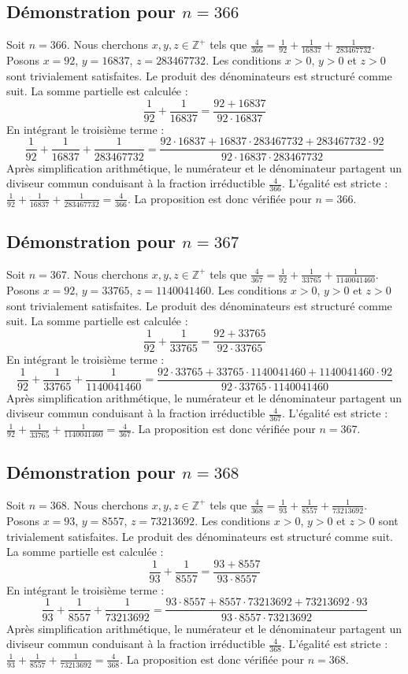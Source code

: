 \documentclass[11pt,a4paper]{article}
\begin{document}
\subsection{Démonstration pour $n = 366$}
Soit $n = 366$. Nous cherchons $x, y, z \in \mathbb{Z}^{+}$ tels que $\frac{4}{366} = \frac{1}{92} + \frac{1}{16837} + \frac{1}{283467732}$.
Posons $x = 92$, $y = 16837$, $z = 283467732$.
Les conditions $x > 0$, $y > 0$ et $z > 0$ sont trivialement satisfaites.
Le produit des dénominateurs est structuré comme suit. La somme partielle est calculée :
$$ \frac{1}{92} + \frac{1}{16837} = \frac{92+16837}{92 \cdot 16837} $$
En intégrant le troisième terme :
$$ \frac{1}{92} + \frac{1}{16837} + \frac{1}{283467732} = \frac{92 \cdot 16837 + 16837 \cdot 283467732 + 283467732 \cdot 92}{92 \cdot 16837 \cdot 283467732} $$
Après simplification arithmétique, le numérateur et le dénominateur partagent un diviseur commun conduisant à la fraction irréductible $\frac{4}{366}$.
L'égalité est stricte : $\frac{1}{92} + \frac{1}{16837} + \frac{1}{283467732} = \frac{4}{366}$.
La proposition est donc vérifiée pour $n = 366$.
\subsection{Démonstration pour $n = 367$}
Soit $n = 367$. Nous cherchons $x, y, z \in \mathbb{Z}^{+}$ tels que $\frac{4}{367} = \frac{1}{92} + \frac{1}{33765} + \frac{1}{1140041460}$.
Posons $x = 92$, $y = 33765$, $z = 1140041460$.
Les conditions $x > 0$, $y > 0$ et $z > 0$ sont trivialement satisfaites.
Le produit des dénominateurs est structuré comme suit. La somme partielle est calculée :
$$ \frac{1}{92} + \frac{1}{33765} = \frac{92+33765}{92 \cdot 33765} $$
En intégrant le troisième terme :
$$ \frac{1}{92} + \frac{1}{33765} + \frac{1}{1140041460} = \frac{92 \cdot 33765 + 33765 \cdot 1140041460 + 1140041460 \cdot 92}{92 \cdot 33765 \cdot 1140041460} $$
Après simplification arithmétique, le numérateur et le dénominateur partagent un diviseur commun conduisant à la fraction irréductible $\frac{4}{367}$.
L'égalité est stricte : $\frac{1}{92} + \frac{1}{33765} + \frac{1}{1140041460} = \frac{4}{367}$.
La proposition est donc vérifiée pour $n = 367$.
\subsection{Démonstration pour $n = 368$}
Soit $n = 368$. Nous cherchons $x, y, z \in \mathbb{Z}^{+}$ tels que $\frac{4}{368} = \frac{1}{93} + \frac{1}{8557} + \frac{1}{73213692}$.
Posons $x = 93$, $y = 8557$, $z = 73213692$.
Les conditions $x > 0$, $y > 0$ et $z > 0$ sont trivialement satisfaites.
Le produit des dénominateurs est structuré comme suit. La somme partielle est calculée :
$$ \frac{1}{93} + \frac{1}{8557} = \frac{93+8557}{93 \cdot 8557} $$
En intégrant le troisième terme :
$$ \frac{1}{93} + \frac{1}{8557} + \frac{1}{73213692} = \frac{93 \cdot 8557 + 8557 \cdot 73213692 + 73213692 \cdot 93}{93 \cdot 8557 \cdot 73213692} $$
Après simplification arithmétique, le numérateur et le dénominateur partagent un diviseur commun conduisant à la fraction irréductible $\frac{4}{368}$.
L'égalité est stricte : $\frac{1}{93} + \frac{1}{8557} + \frac{1}{73213692} = \frac{4}{368}$.
La proposition est donc vérifiée pour $n = 368$.
\end{document}
